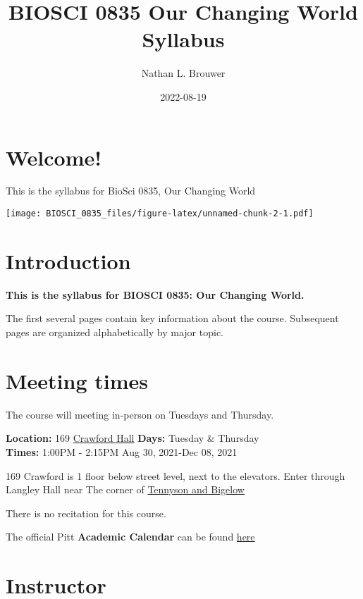 \documentclass[
]{book}
\title{BIOSCI 0835 Our Changing World Syllabus}
\author{Nathan L. Brouwer}
\date{2022-08-19}
\begin{document}
\maketitle

{
\setcounter{tocdepth}{1}
\tableofcontents
}
\hypertarget{welcome}{%
\chapter{Welcome!}\label{welcome}}

This is the syllabus for BioSci 0835, Our Changing World

\texttt{[image: BIOSCI\_0835\_files/figure-latex/unnamed-chunk-2-1.pdf]}

\hypertarget{intro}{%
\chapter{Introduction}\label{intro}}

\textbf{This is the syllabus for BIOSCI 0835: Our Changing World.}

The first several pages contain key information about the course. Subsequent pages are organized alphabetically by major topic.

\hypertarget{meeting-times}{%
\chapter{Meeting times}\label{meeting-times}}

The course will meeting in-person on Tuesdays and Thursday.

\textbf{Location:} 169 \href{https://calendar.pitt.edu/crawford_hall_909\#.YSZMWdPYq3I}{Crawford Hall}
\textbf{Days:} Tuesday \& Thursday\\
\textbf{Times:} 1:00PM - 2:15PM
Aug 30, 2021-Dec 08, 2021

169 Crawford is 1 floor below street level, next to the elevators. Enter through Langley Hall near The corner of \href{https://goo.gl/maps/ay3KxznH1u4VisWo8}{Tennyson and Bigelow}

There is no recitation for this course.

The official Pitt \textbf{Academic Calendar} can be found \href{https://www.registrar.pitt.edu/sites/default/files/pdf/Academic\%20Calendar\%202022-2023_Apple.pdf}{here}

\hypertarget{nlb}{%
\chapter{Instructor}\label{nlb}}
\end{document}
